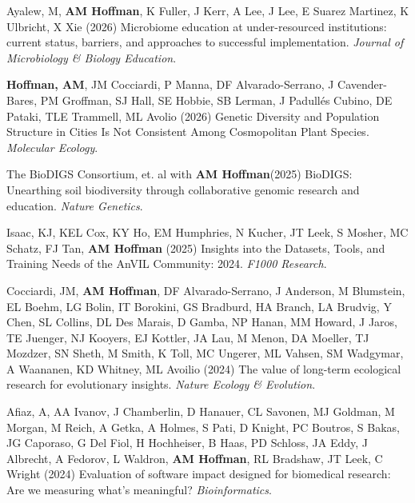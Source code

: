\documentclass{cv}
\begin{document}
\begin{pubenum}

\item Ayalew, M, \textbf{AM Hoffman}, K Fuller, J Kerr, A Lee, J Lee, E Suarez Martinez, K Ulbricht, X Xie (2026) Microbiome education at under-resourced institutions: current status, barriers, and approaches to successful implementation. \textit{Journal of Microbiology \& Biology Education}. 

\item \textbf{Hoffman, AM}\footnotemark[1], JM Cocciardi, P Manna, DF Alvarado-Serrano, J Cavender-Bares, PM Groffman, SJ Hall, SE Hobbie, SB Lerman, J Padullés Cubino, DE Pataki, TLE Trammell, ML Avolio (2026) Genetic Diversity and Population Structure in Cities Is Not Consistent Among Cosmopolitan Plant Species. \textit{Molecular Ecology}. 


\item The BioDIGS Consortium, et. al with \textbf{AM Hoffman}\footnotemark[1] (2025) BioDIGS: Unearthing soil biodiversity through collaborative genomic research and education. \textit{Nature Genetics}. 

\item Isaac, KJ\footnotemark[2], KEL Cox, KY Ho, EM Humphries, N Kucher, JT Leek, S Mosher, MC Schatz, FJ Tan, \textbf{AM Hoffman} (2025) Insights into the Datasets, Tools, and Training Needs of the AnVIL Community: 2024. \textit{F1000 Research}. 


\item Cocciardi, JM, \textbf{AM Hoffman}, DF Alvarado-Serrano, J Anderson, M Blumstein, EL Boehm, LG Bolin, IT Borokini, GS Bradburd, HA Branch, LA Brudvig, Y Chen, SL Collins, DL Des Marais, D Gamba, NP Hanan, MM Howard, J Jaros, TE Juenger, NJ Kooyers, EJ Kottler, JA Lau, M Menon, DA Moeller, TJ Mozdzer, SN Sheth, M Smith, K Toll, MC Ungerer, ML Vahsen, SM Wadgymar, A Waananen, KD Whitney, ML Avoilio (2024) The value of long-term ecological research for evolutionary insights. \textit{Nature Ecology \& Evolution}. 

\item Afiaz, A, AA Ivanov, J Chamberlin, D Hanauer, CL Savonen, MJ Goldman, M Morgan, M Reich, A Getka, A Holmes, S Pati, D Knight, PC Boutros, S Bakas, JG Caporaso, G Del Fiol, H Hochheiser, B Haas, PD Schloss, JA Eddy, J Albrecht, A Fedorov, L Waldron, \textbf{AM Hoffman}, RL Bradshaw, JT Leek, C Wright (2024) Evaluation of software impact designed for biomedical research: Are we measuring what's meaningful? \textit{Bioinformatics}. 


\end{pubenum}
\end{document}
